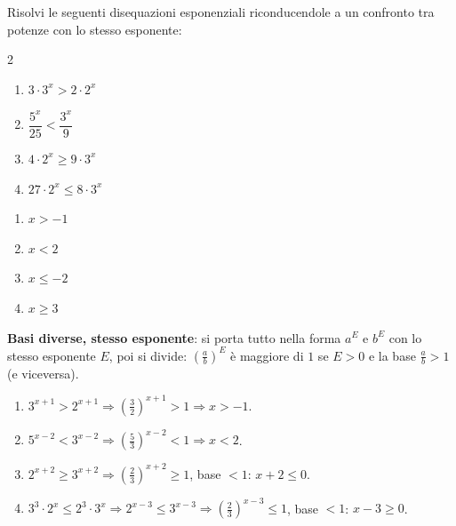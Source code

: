 
\begin{question}[ID=5.12, subtitle={Disequazioni con basi diverse e coefficienti interi}, difficulty=media, tags={disequazioni, esponenziali, basi diverse}]
Risolvi le seguenti disequazioni esponenziali riconducendole a un confronto tra potenze con lo stesso esponente:
\begin{center}\begin{minipage}{0.92\linewidth}
\begin{multicols}{2}
\begin{enumerate}[leftmargin=3.2cm]
\item $3 \cdot 3^{x} > 2 \cdot 2^{x}$
\item $\dfrac{5^{x}}{25} < \dfrac{3^{x}}{9}$
\item $4 \cdot 2^{x} \geq 9 \cdot 3^{x}$
\item $27 \cdot 2^{x} \leq 8 \cdot 3^{x}$
\end{enumerate}
\end{multicols}
\end{minipage}\end{center}
\begin{solution}
\begin{enumerate}
    \item $x>-1$
    \item $x<2$
    \item $x\leq-2$
    \item $x\geq3$
\end{enumerate}
\end{solution}
\begin{explanation}
\textbf{Basi diverse, stesso esponente}: si porta tutto nella forma $a^{E}$ e $b^{E}$ con lo stesso esponente $E$, poi si divide: $\left(\tfrac ab\right)^{E}$ è maggiore di $1$ se $E>0$ e la base $\tfrac ab>1$ (e viceversa).
\begin{enumerate}
    \item $3^{x+1}>2^{x+1} \Rightarrow \left(\tfrac32\right)^{x+1}>1 \Rightarrow x>-1$.
    \item $5^{x-2}<3^{x-2} \Rightarrow \left(\tfrac53\right)^{x-2}<1 \Rightarrow x<2$.
    \item $2^{x+2}\geq3^{x+2} \Rightarrow \left(\tfrac23\right)^{x+2}\geq1$, base $<1$: $x+2\leq0$.
    \item $3^3\cdot2^x\leq2^3\cdot3^x \Rightarrow 2^{x-3}\leq3^{x-3} \Rightarrow \left(\tfrac23\right)^{x-3}\leq1$, base $<1$: $x-3\geq0$.
\end{enumerate}
\end{explanation}
\end{question}

